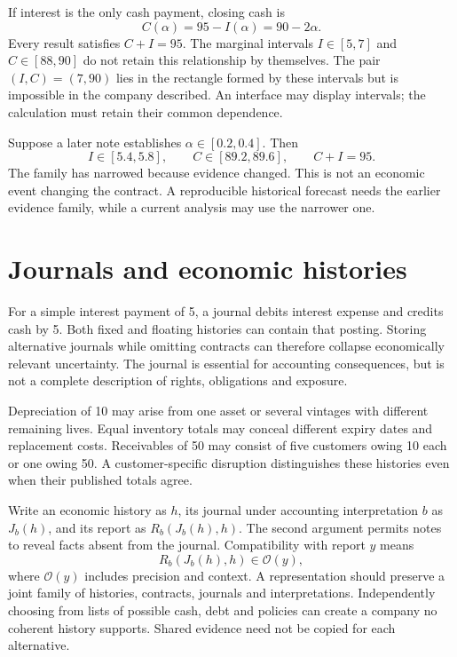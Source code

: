 If interest is the only cash payment, closing cash is
\begin{equation}
 C(\alpha)=95-I(\alpha)=90-2\alpha.\label{sim:cash-family}
\end{equation}
Every result satisfies $C+I=95$. The marginal intervals $I\in[5,7]$ and $C\in[88,90]$ do not retain this relationship by themselves. The pair $(I,C)=(7,90)$ lies in the rectangle formed by these intervals but is impossible in the company described. An interface may display intervals; the calculation must retain their common dependence.

Suppose a later note establishes $\alpha\in[0.2,0.4]$. Then
\begin{equation}
 I\in[5.4,5.8],\qquad C\in[89.2,89.6],\qquad C+I=95.
\end{equation}
The family has narrowed because evidence changed. This is not an economic event changing the contract. A reproducible historical forecast needs the earlier evidence family, while a current analysis may use the narrower one.

\section{Journals and economic histories}
For a simple interest payment of 5, a journal debits interest expense and credits cash by 5. Both fixed and floating histories can contain that posting. Storing alternative journals while omitting contracts can therefore collapse economically relevant uncertainty. The journal is essential for accounting consequences, but is not a complete description of rights, obligations and exposure.

Depreciation of 10 may arise from one asset or several vintages with different remaining lives. Equal inventory totals may conceal different expiry dates and replacement costs. Receivables of 50 may consist of five customers owing 10 each or one owing 50. A customer-specific disruption distinguishes these histories even when their published totals agree.

Write an economic history as $h$, its journal under accounting interpretation $b$ as $J_b(h)$, and its report as $R_b(J_b(h),h)$. The second argument permits notes to reveal facts absent from the journal. Compatibility with report $y$ means
\begin{equation}
 R_b(J_b(h),h)\in\mathcal O(y),\label{sim:compatibility-intro}
\end{equation}
where $\mathcal O(y)$ includes precision and context. A representation should preserve a joint family of histories, contracts, journals and interpretations. Independently choosing from lists of possible cash, debt and policies can create a company no coherent history supports. Shared evidence need not be copied for each alternative.

